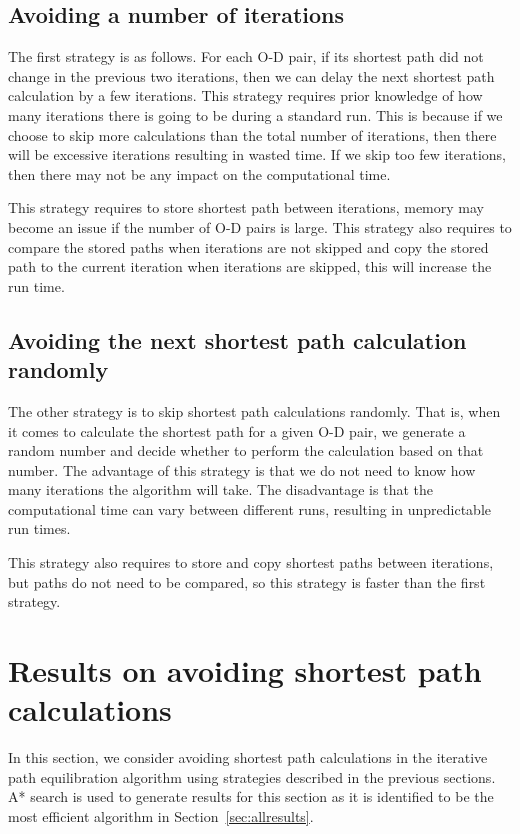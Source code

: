 \subsection{Avoiding a number of iterations}
The first strategy is as follows.
For each O-D pair,
if its shortest path did not change in the previous two iterations,
then we can delay the next shortest path calculation by a few iterations.
This strategy requires prior knowledge of how many iterations there is going to be during a standard run.
This is because if we choose to skip more calculations than the total number of iterations,
then there will be excessive iterations resulting in wasted time.
If we skip too few iterations,
then there may not be any impact on the computational time.

This strategy requires to store shortest path between iterations,
memory may become an issue if the number of O-D pairs is large.
This strategy also requires to compare the stored paths when iterations are not skipped and  copy the stored path to the current iteration when iterations are skipped,
this will increase the run time.

\subsection{Avoiding the next shortest path calculation randomly}
The other strategy is to skip shortest path calculations randomly.
That is, when it comes to calculate the shortest path for a given O-D pair,
we generate a random number and decide whether to perform the calculation based on that number.
The advantage of this strategy is that we do not need to know how many iterations the algorithm will take.
The disadvantage is that the computational time can vary between different runs,
resulting in unpredictable run times.

This strategy also requires to store and copy shortest paths between iterations,
but paths do not need to be compared, so this strategy is faster than the first strategy.

\section{Results on avoiding shortest path calculations}
In this section, we consider avoiding shortest path calculations in the iterative path equilibration algorithm using strategies described in the previous sections.
A* search is used to generate results for this section as it is identified to be the most efficient algorithm in Section~\ref{sec:allresults}.

